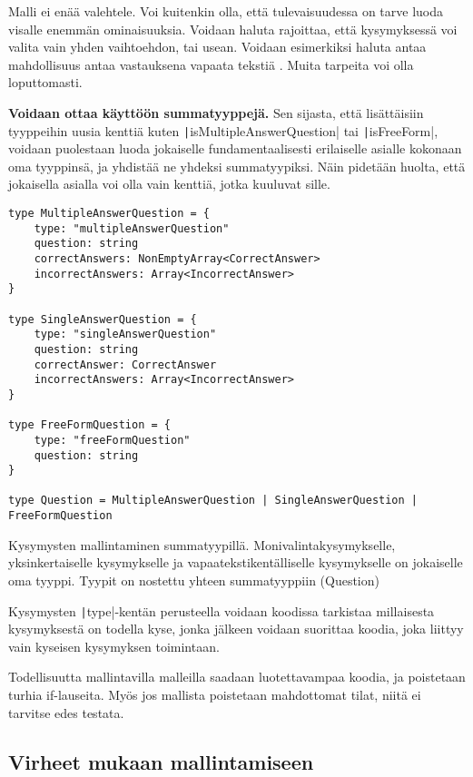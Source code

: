 Malli ei enää valehtele. Voi kuitenkin olla, että tulevaisuudessa on tarve luoda visalle enemmän ominaisuuksia. Voidaan haluta rajoittaa, että kysymyksessä voi valita vain yhden vaihtoehdon, tai usean. Voidaan esimerkiksi haluta antaa mahdollisuus antaa vastauksena vapaata tekstiä \cite{impossiblebetter}. Muita tarpeita voi olla loputtomasti.

\textbf{Voidaan ottaa käyttöön summatyyppejä.} Sen sijasta, että lisättäisiin tyyppeihin uusia kenttiä kuten \texttt|isMultipleAnswerQuestion| tai \texttt|isFreeForm|, voidaan puolestaan luoda jokaiselle fundamentaalisesti erilaiselle asialle kokonaan oma tyyppinsä, ja yhdistää ne yhdeksi summatyypiksi. Näin pidetään huolta, että jokaisella asialla voi olla vain kenttiä, jotka kuuluvat sille.

\begin{code}
    \begin{verbatim}
type MultipleAnswerQuestion = {
    type: "multipleAnswerQuestion"
    question: string
    correctAnswers: NonEmptyArray<CorrectAnswer>
    incorrectAnswers: Array<IncorrectAnswer>
}

type SingleAnswerQuestion = {
    type: "singleAnswerQuestion"
    question: string
    correctAnswer: CorrectAnswer
    incorrectAnswers: Array<IncorrectAnswer>
}

type FreeFormQuestion = {
    type: "freeFormQuestion"
    question: string
}

type Question = MultipleAnswerQuestion | SingleAnswerQuestion | FreeFormQuestion
    \end{verbatim}
    \caption{Kysymysten mallintaminen summatyypillä. Monivalintakysymykselle, yksinkertaiselle kysymykselle ja vapaatekstikentälliselle kysymykselle on jokaiselle oma tyyppi. Tyypit on nostettu yhteen summatyyppiin (Question)}
    \label{code:ts_sum_type_nice}
\end{code}

Kysymysten \texttt|type|-kentän perusteella voidaan koodissa tarkistaa millaisesta kysymyksestä on todella kyse, jonka jälkeen voidaan suorittaa koodia, joka liittyy vain kyseisen kysymyksen toimintaan.

Todellisuutta mallintavilla malleilla saadaan luotettavampaa koodia, ja poistetaan turhia if-lauseita. Myös jos mallista poistetaan mahdottomat tilat, niitä ei tarvitse edes testata.

\subsection{Virheet mukaan mallintamiseen}

